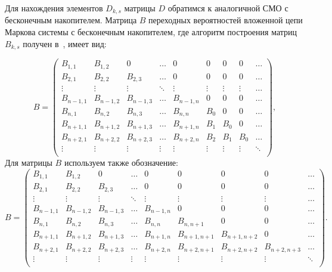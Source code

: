 \smallskip
\begin{multicols}{2}

Для нахождения элементов $D_{k,s}$ матрицы $D$ обратимся к аналогичной СМО с 
бесконечным накопителем. Матрица $B$ переходных вероятностей вложенной цепи 
Маркова системы с бесконечным накопителем, где алгоритм построения матриц 
$B_{k,s}$ получен в~\cite{PSCh06}, имеет вид: 
\end{multicols}
\smallskip
\noindent
$$
B=
\begin{pmatrix}
B_{1,1} & B_{1,2} &  0     & \ldots &  0        &  0  &  0  &  0  & \ldots
  \\
B_{2,1} & B_{2,2} & B_{2,3} & \ldots &  0        &  0  &  0  &  0  & \ldots
   \\
\vdots & \vdots & \vdots & \ddots & \vdots & \vdots & \vdots & \vdots &
\ldots \\
B_{n-1,1} & B_{n-1,2} & B_{n-1,3} & \ldots & B_{n-1,n} &  0  &  0  &  0  &
\ldots    \\
B_{n,1} & B_{n,2} & B_{n,3} & \ldots & B_{n,n} & B_0 &  0  &  0  & \ldots
\\
B_{n+1,1} & B_{n+1,2} & B_{n+1,3} & \ldots & B_{n+1,n} & B_1 & B_0 &  0  &
\ldots  \\
B_{n+2,1} & B_{n+2,2} & B_{n+2,3} & \ldots & B_{n+2,n} & B_2 & B_1 & B_0 &
\ldots  \\
\vdots & \vdots & \vdots & \vdots & \vdots & \vdots & \vdots & \vdots &
\ddots    \\
  \end{pmatrix},
$$
\smallskip
Для матрицы $B$ используем также обозначение:
\smallskip
$$
B=
  \begin{pmatrix}
B_{1,1} & B_{1,2} &  0     & \ldots &  0        &  0  &  0  &  0  & \ldots
  \\
B_{2,1} & B_{2,2} & B_{2,3} & \ldots &  0        &  0  &  0  &  0  & \ldots
   \\
\vdots & \vdots & \vdots & \ddots & \vdots & \vdots & \vdots & \vdots &
\ldots \\
B_{n-1,1} & B_{n-1,2} & B_{n-1,3} & \ldots & B_{n-1,n} &  0  &  0  &  0  &
\ldots    \\
B_{n,1} & B_{n,2} & B_{n,3} & \ldots & B_{n,n} & B_{n,n+1} &  0  &  0  &
\ldots  \\
B_{n+1,1} & B_{n+1,2} & B_{n+1,3} & \ldots & B_{n+1,n} & B_{n+1,n+1}
                  & B_{n+1,n+2} & 0 & \ldots    \\
B_{n+2,1} & B_{n+2,2} & B_{n+2,3} & \ldots & B_{n+2,n} & B_{n+2,n+1}
                  & B_{n+2,n+2} & B_{n+2,n+3} & \ldots   \\
\vdots & \vdots & \vdots & \vdots & \vdots & \vdots & \vdots & \vdots &
\ddots    \\
  \end{pmatrix}.
$$
